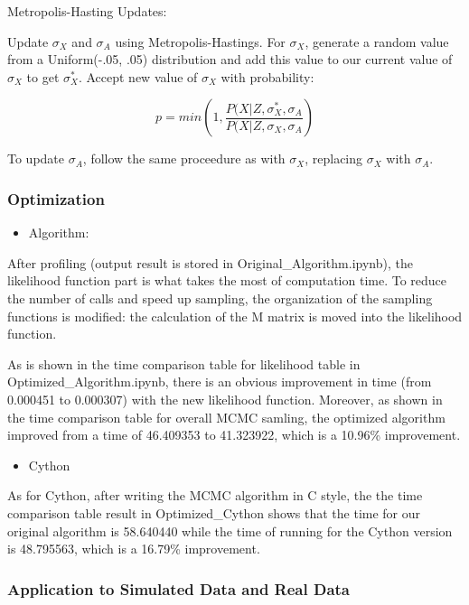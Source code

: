 \documentclass[11pt]{article}
\providecommand{\tightlist}{%
      \setlength{\itemsep}{0pt}\setlength{\parskip}{0pt}}
\begin{document}
Metropolis-Hasting Updates:

Update \(\sigma_X\) and \(\sigma_A\) using Metropolis-Hastings. For
\(\sigma_X\), generate a random value from a Uniform(-.05, .05)
distribution and add this value to our current value of \(\sigma_X\) to
get \(\sigma_X^*\). Accept new value of \(\sigma_X\) with probability:

\[p = min(1, \dfrac{P(X|Z, \sigma_X^*, \sigma_A}{P(X|Z, \sigma_X, \sigma_A})\]

To update \(\sigma_A\), follow the same proceedure as with \(\sigma_X\),
replacing \(\sigma_X\) with \(\sigma_A\).

    \hypertarget{optimization}{%
\subsubsection{Optimization}\label{optimization}}

    \begin{itemize}
\tightlist
\item
  Algorithm:
\end{itemize}

    After profiling (output result is stored in Original\_Algorithm.ipynb),
the likelihood function part is what takes the most of computation time.
To reduce the number of calls and speed up sampling, the organization of
the sampling functions is modified: the calculation of the M matrix is
moved into the likelihood function.

As is shown in the time comparison table for likelihood table in
Optimized\_Algorithm.ipynb, there is an obvious improvement in time
(from 0.000451 to 0.000307) with the new likelihood function. Moreover,
as shown in the time comparison table for overall MCMC samling, the
optimized algorithm improved from a time of 46.409353 to 41.323922,
which is a 10.96\% improvement.

    \begin{itemize}
\tightlist
\item
  Cython
\end{itemize}

    As for Cython, after writing the MCMC algorithm in C style, the the time
comparison table result in Optimized\_Cython shows that the time for our
original algorithm is 58.640440 while the time of running for the Cython
version is 48.795563, which is a 16.79\% improvement.

    \hypertarget{application-to-simulated-data-and-real-data}{%
\subsubsection{Application to Simulated Data and Real
Data}\label{application-to-simulated-data-and-real-data}}
\end{document}
